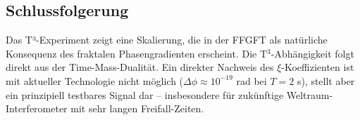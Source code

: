 	\subsection*{Schlussfolgerung}
	
	Das T³-Experiment zeigt eine Skalierung, die in der FFGFT als natürliche Konsequenz des fraktalen Phasengradienten erscheint. Die T\(^3\)-Abhängigkeit folgt direkt aus der Time-Mass-Dualität. Ein direkter Nachweis des \(\xi\)-Koeffizienten ist mit aktueller Technologie nicht möglich (\(\Delta\phi \approx 10^{-19}\) rad bei \(T = 2\) s), stellt aber ein prinzipiell testbares Signal dar -- insbesondere für zukünftige Weltraum-Interferometer mit sehr langen Freifall-Zeiten.



